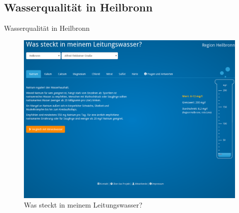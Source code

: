 \subsection{Wasserqualität in Heilbronn}
\begin{frame}[t]{Wasserqualität in Heilbronn}
\begin{figure}[h]
 \centering
 \includegraphics[scale=0.2]{section_other_ok_labs_water_quality.png}
 \caption{Was steckt in meinem Leitungswasser? \cite{Heilbronn}}
\end{figure}
\end{frame}
